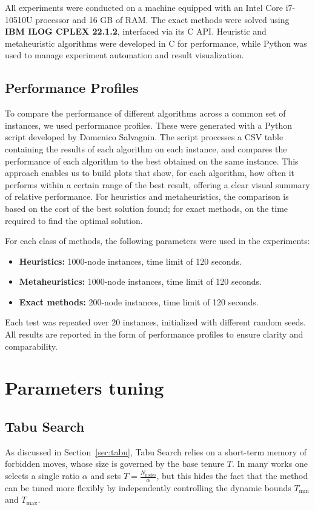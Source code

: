 All experiments were conducted on a machine equipped with an Intel Core i7-10510U processor and 16 GB of RAM. The exact methods were solved using \textbf{IBM ILOG CPLEX 22.1.2}, interfaced via its C API. Heuristic and metaheuristic algorithms were developed in C for performance, while Python was used to manage experiment automation and result visualization.

\subsection{Performance Profiles}

To compare the performance of different algorithms across a common set of instances, we used performance profiles. These were generated with a Python script developed by Domenico Salvagnin. The script processes a CSV table containing the results of each algorithm on each instance, and compares the performance of each algorithm to the best obtained on the same instance.
This approach enables us to build plots that show, for each algorithm, how often it performs within a certain range of the best result, offering a clear visual summary of relative performance. For heuristics and metaheuristics, the comparison is based on the cost of the best solution found; for exact methods, on the time required to find the optimal solution.

For each class of methods, the following parameters were used in the experiments:
\begin{itemize}
    \item \textbf{Heuristics:} 1000-node instances, time limit of 120 seconds.
    \item \textbf{Metaheuristics:} 1000-node instances, time limit of 120 seconds.
    \item \textbf{Exact methods:} 200-node instances, time limit of 120 seconds.
    
    
\end{itemize}

Each test was repeated over 20 instances, initialized with different random seeds. All results are reported in the form of performance profiles to ensure clarity and comparability.

\section{Parameters tuning}

\subsection{Tabu Search}
As discussed in Section~\ref{sec:tabu}, Tabu Search relies on a short-term memory of forbidden moves, whose size is governed by the base tenure \(T\).  In many works one selects a single ratio \(\alpha\) and sets \(T=\frac{N_{\mathrm{nodes}}}{\alpha}\), but this hides the fact that the method can be tuned more flexibly by independently controlling the dynamic bounds \(T_{\min}\) and \(T_{\max}\).

